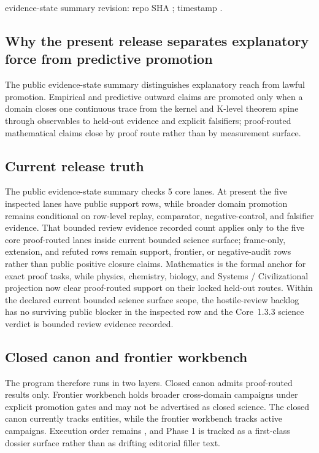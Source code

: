 evidence-state summary revision: repo SHA ; timestamp .

\subsection{Why the present release separates explanatory force from predictive promotion}
The public evidence-state summary distinguishes explanatory reach from lawful promotion. Empirical and predictive outward claims are promoted only when a domain closes one continuous trace from the kernel and K-level theorem spine through observables to held-out evidence and explicit falsifiers; proof-routed mathematical claims close by proof route rather than by measurement surface.

\subsection{Current release truth}
The public evidence-state summary checks 5 core lanes. At present the five inspected lanes have public support rows, while broader domain promotion remains conditional on row-level replay, comparator, negative-control, and falsifier evidence.
That bounded review evidence recorded count applies only to the five core proof-routed lanes inside current bounded science surface; frame-only, extension, and refuted rows remain support, frontier, or negative-audit rows rather than public positive closure claims.
Mathematics is the formal anchor for exact proof tasks, while physics, chemistry, biology, and Systems / Civilizational projection now clear proof-routed support on their locked held-out routes. Within the declared current bounded science surface scope, the hostile-review backlog has no surviving public blocker in the inspected row and the Core~1.3.3 science verdict is bounded review evidence recorded.

\subsection{Closed canon and frontier workbench}
The program therefore runs in two layers. Closed canon admits proof-routed results only. Frontier workbench holds broader cross-domain campaigns under explicit promotion gates and may not be advertised as closed science.
The closed canon currently tracks  entities, while the frontier workbench tracks  active campaigns.
Execution order remains , and Phase 1 is tracked as a first-class dossier surface rather than as drifting editorial filler text.

